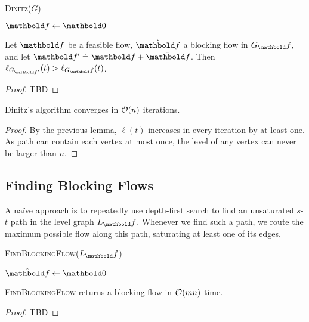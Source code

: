 \begin{algorithm}
    \caption{\textsc{Dinitz($G$)}}
    $\vf \gets \vZero$\;
    \Return{$\vf$}
\end{algorithm}

\begin{lem}
Let $\vf$ be a feasible flow, $\hat{\vf}$ a blocking flow in $G_\vf$, and let $\vf' \defeq \vf + \hat{\vf}$. Then $\ell_{G_{\vf'}}(t) > \ell_{G_\vf}(t)$.
\end{lem}
\begin{proof}
TBD
\end{proof}

\begin{thm}[Dinitz]
Dinitz's algorithm converges in $\LandauO{n}$ iterations.
\end{thm}
\begin{proof}
By the previous lemma, $\ell(t)$ increases in every iteration by at least one. As path can contain each vertex at most once, the level of any vertex can never be larger than $n$.
\end{proof}

\subsection{Finding Blocking Flows}

A naïve approach is to repeatedly use depth-first search to find an unsaturated $s$-$t$ path in the level graph $L_\vf$. Whenever we find such a path, we route the maximum possible flow along this path, saturating at least one of its edges.

\begin{algorithm}
    \caption{\textsc{FindBlockingFlow($L_\vf$)}}
    $\hat{\vf} \gets \vZero$\;
    \Return{$\hat{\vf}$}
\end{algorithm}

\begin{lem}
\textsc{FindBlockingFlow} returns a blocking flow in $\LandauO{mn}$ time.
\end{lem}
\begin{proof}
TBD
\end{proof}

